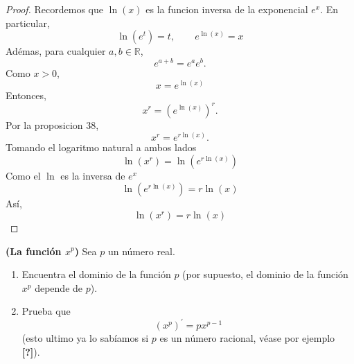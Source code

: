 \documentclass[12pt,a4paper]{article}
\begin{document}
    \begin{proof}
        Recordemos que $\ln(x)$ es la funcion inversa de la exponencial $e^{x}$. En particular,
        \begin{equation*}
            \ln(e^{t})=t,\qquad e^{\ln(x)}=x
        \end{equation*}
        Adémas, para cualquier $a,b\in\mathbb{R}$,
        \begin{equation*}
            e^{a+b}=e^{a}e^{b}.
        \end{equation*}
        Como $x\gt0$,
        \begin{equation*}
            x=e^{\ln(x)}
        \end{equation*}
        Entonces,
        \begin{equation*}
            x^{r}=(e^{\ln(x)})^{r}.
        \end{equation*}
        Por la proposicion 38,
        \begin{equation*}
            x^{r}=e^{r\ln(x)}.
        \end{equation*}
        Tomando el logaritmo natural a ambos lados
        \begin{equation*}
            \ln(x^{r})=\ln(e^{r\ln(x)})
        \end{equation*}
        Como el $\ln$ es la inversa de $e^{x}$
        \begin{equation*}
            \ln(e^{r\ln(x)})=r\ln(x)
        \end{equation*}
        Así,
        \begin{equation*}
            \ln(x^{r})=r\ln(x)
        \end{equation*}
    \end{proof}

    \begin{mdframed}[style=mdbluebox,frametitle={Ejercicio 7}]
        \textbf{(La función $x^{p}$)} Sea $p$ un número real.
        \begin{enumerate}
            \item[(a)] Encuentra el dominio de la función $p$ (por supuesto, el dominio de la
            función $x^{p}$ depende de $p$).
            \item[(b)] Prueba que
            \begin{equation*}
                (x^{p})^{\prime}=px^{p-1}
            \end{equation*}
            (esto ultimo ya lo sabíamos si $p$ es un número racional, véase por ejemplo
            \textbf{[?]}).
        \end{enumerate}
    \end{mdframed}
\end{document}
